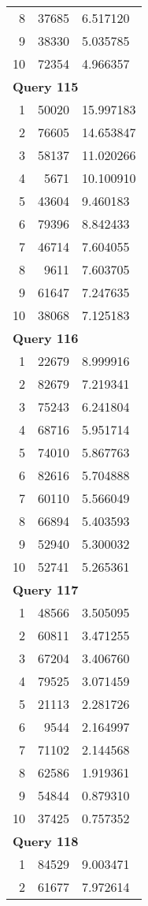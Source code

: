 \begin{longtable}[{p}]{@{}rrp{}@{}}
8 & 37685 & 6.517120 \\
9 & 38330 & 5.035785 \\
10 & 72354 & 4.966357 \\
\midrule
\multicolumn{3}{l}{\bfseries Query 115} \\
1 & 50020 & 15.997183 \\
2 & 76605 & 14.653847 \\
3 & 58137 & 11.020266 \\
4 & 5671 & 10.100910 \\
5 & 43604 & 9.460183 \\
6 & 79396 & 8.842433 \\
7 & 46714 & 7.604055 \\
8 & 9611 & 7.603705 \\
9 & 61647 & 7.247635 \\
10 & 38068 & 7.125183 \\
\midrule
\multicolumn{3}{l}{\bfseries Query 116} \\
1 & 22679 & 8.999916 \\
2 & 82679 & 7.219341 \\
3 & 75243 & 6.241804 \\
4 & 68716 & 5.951714 \\
5 & 74010 & 5.867763 \\
6 & 82616 & 5.704888 \\
7 & 60110 & 5.566049 \\
8 & 66894 & 5.403593 \\
9 & 52940 & 5.300032 \\
10 & 52741 & 5.265361 \\
\midrule
\multicolumn{3}{l}{\bfseries Query 117} \\
1 & 48566 & 3.505095 \\
2 & 60811 & 3.471255 \\
3 & 67204 & 3.406760 \\
4 & 79525 & 3.071459 \\
5 & 21113 & 2.281726 \\
6 & 9544 & 2.164997 \\
7 & 71102 & 2.144568 \\
8 & 62586 & 1.919361 \\
9 & 54844 & 0.879310 \\
10 & 37425 & 0.757352 \\
\midrule
\multicolumn{3}{l}{\bfseries Query 118} \\
1 & 84529 & 9.003471 \\
2 & 61677 & 7.972614 \\

\end{longtable}
